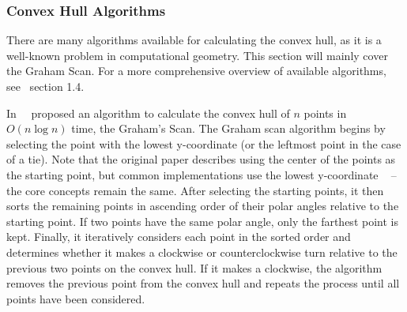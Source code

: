 \subsubsection{Convex Hull Algorithms}
There are many algorithms available for calculating the convex hull, as it is a well-known problem in computational geometry.
This section will mainly cover the Graham Scan.
For a more comprehensive overview of available algorithms, see~\cite{de_berg_computational_2008} section 1.4.

In~\citeyear{graham_efficient_1972}~\cite{graham_efficient_1972} proposed an algorithm to calculate
the convex hull of $n$ points in $O(n \log n)$ time, the Graham's Scan.
The Graham scan algorithm begins by selecting the point with the lowest y-coordinate (or the leftmost point in the case of a tie).
Note that the original paper describes using the center of the points as the starting point,
but common implementations use the lowest y-coordinate
~\multiplefootnoteseparator{} --
the core concepts remain the same.
After selecting the starting points, it then sorts the remaining points in ascending order
of their polar angles relative to the starting point.
If two points have the same polar angle, only the farthest point is kept.
Finally, it iteratively considers each point in the sorted order and determines whether it
makes a clockwise or counterclockwise turn relative to the previous two points on the convex hull.
If it makes a clockwise, the algorithm removes the previous point from the convex hull
and repeats the process until all points have been considered.


